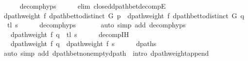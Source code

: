 \begin{isabellebody}
\ \ \ \ \isamarkupfalse%
\ decomp{\isachardot}{\kern0pt}hyps\isanewline
\ \ \ \ \isamarkupfalse%
\ {\isacharparenleft}{\kern0pt}elim\ closed{\isacharunderscore}{\kern0pt}dpath{\isacharunderscore}{\kern0pt}bet{\isacharunderscore}{\kern0pt}decompE{\isacharunderscore}{\kern0pt}{}{\isacharparenright}{\kern0pt}\isanewline
\isanewline
\ \ \isamarkupfalse%
\ {\isachardoublequoteopen}dpath{\isacharunderscore}{\kern0pt}weight\ f\ {\isacharparenleft}{\kern0pt}dpath{\isacharunderscore}{\kern0pt}bet{\isacharunderscore}{\kern0pt}to{\isacharunderscore}{\kern0pt}distinct\ G\ p{\isacharparenright}{\kern0pt}\ {\isacharequal}{\kern0pt}\ dpath{\isacharunderscore}{\kern0pt}weight\ f\ {\isacharparenleft}{\kern0pt}dpath{\isacharunderscore}{\kern0pt}bet{\isacharunderscore}{\kern0pt}to{\isacharunderscore}{\kern0pt}distinct\ G\ {\isacharparenleft}{\kern0pt}q\ {\isacharat}{\kern0pt}\ tl\ s{\isacharparenright}{\kern0pt}{\isacharparenright}{\kern0pt}{\isachardoublequoteclose}\isanewline
\ \ \ \ \isamarkupfalse%
\ decomp{\isachardot}{\kern0pt}hyps{\isacharparenleft}{\kern0pt}{}{\isacharcomma}{\kern0pt}\ {}{\isacharparenright}{\kern0pt}\isanewline
\ \ \ \ \isamarkupfalse%
\ {\isacharparenleft}{\kern0pt}auto\ simp\ add{\isacharcolon}{\kern0pt}\ decomp{\isachardot}{\kern0pt}hyps{\isacharparenleft}{\kern0pt}{}{\isacharparenright}{\kern0pt}{\isacharparenright}{\kern0pt}\isanewline
\ \ \isamarkupfalse%
\ \isamarkupfalse%
\ {\isachardoublequoteopen}{\isachardot}{\kern0pt}{\isachardot}{\kern0pt}{\isachardot}{\kern0pt}\ {\isasymle}\ dpath{\isacharunderscore}{\kern0pt}weight\ f\ {\isacharparenleft}{\kern0pt}q\ {\isacharat}{\kern0pt}\ tl\ s{\isacharparenright}{\kern0pt}{\isachardoublequoteclose}\isanewline
\ \ \ \ \isamarkupfalse%
\ decomp{\isachardot}{\kern0pt}IH\isanewline
\ \ \ \ \isacommand{{\isachardot}{\kern0pt}}\isamarkupfalse%
\isanewline
\ \ \isamarkupfalse%
\ \isamarkupfalse%
\ {\isachardoublequoteopen}{\isachardot}{\kern0pt}{\isachardot}{\kern0pt}{\isachardot}{\kern0pt}\ {\isacharequal}{\kern0pt}\ dpath{\isacharunderscore}{\kern0pt}weight\ f\ q\ {\isacharplus}{\kern0pt}\ dpath{\isacharunderscore}{\kern0pt}weight\ f\ s{\isachardoublequoteclose}\isanewline
\ \ \ \ \isamarkupfalse%
\ dpaths\isanewline
\ \ \ \ \isamarkupfalse%
\ {\isacharparenleft}{\kern0pt}auto\ simp\ add{\isacharcolon}{\kern0pt}\ dpath{\isacharunderscore}{\kern0pt}bet{\isacharunderscore}{\kern0pt}nonempty{\isacharunderscore}{\kern0pt}dpath{\isacharparenleft}{\kern0pt}{}{\isacharcomma}{\kern0pt}\ {}{\isacharparenright}{\kern0pt}\ intro{\isacharcolon}{\kern0pt}\ dpath{\isacharunderscore}{\kern0pt}weight{\isacharunderscore}{\kern0pt}append{\isacharunderscore}{\kern0pt}{}{\isacharparenright}{\kern0pt}\isanewline

\end{isabellebody}
